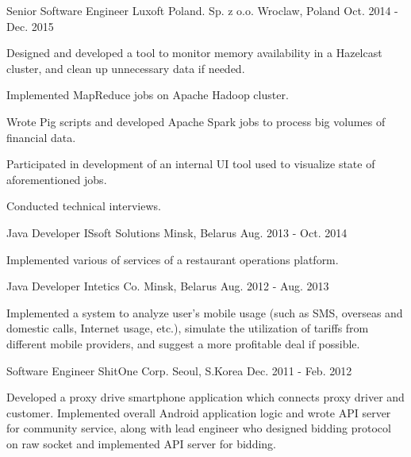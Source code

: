 \begin{cventries}
    \cventry
    {Senior Software Engineer} %
    {Luxoft Poland. Sp. z o.o.} %
    {Wroclaw, Poland} %
    {Oct. 2014 - Dec. 2015} %
    {
        \begin{cvitems} %
            \item {Designed and developed a tool to monitor memory availability in a Hazelcast cluster, and clean up unnecessary data if needed.}
            \item {Implemented MapReduce jobs on Apache Hadoop cluster.}
            \item {Wrote Pig scripts and developed Apache Spark jobs to process big volumes of financial data.}
            \item {Participated in development of an internal UI tool used to visualize state of aforementioned jobs.}
            \item {Conducted technical interviews.}
        \end{cvitems}
    }

    \cventry
    {Java Developer} %
    {ISsoft Solutions} %
    {Minsk, Belarus} %
    {Aug. 2013 - Oct. 2014} %
    {
        \begin{cvitems} %
            \item {Implemented various of services of a restaurant operations platform.}
        \end{cvitems}
    }

    \cventry
    {Java Developer} %
    {Intetics Co.} %
    {Minsk, Belarus} %
    {Aug. 2012 - Aug. 2013} %
    {
        \begin{cvitems} %
            \item {Implemented a system to analyze user’s mobile usage (such as SMS, overseas and domestic calls, Internet usage, etc.), simulate the utilization of tariffs from different mobile providers, and suggest a more profitable deal if possible.}
        \end{cvitems}
    }

    \cventry
    {Software Engineer} %
    {ShitOne Corp.} %
    {Seoul, S.Korea} %
    {Dec. 2011 - Feb. 2012} %
    {
        \begin{cvitems} %
            \item {Developed a proxy drive smartphone application which connects proxy driver and customer. Implemented overall Android application logic and wrote API server for community service, along with lead engineer who designed bidding protocol on raw socket and implemented API server for bidding.}
        \end{cvitems}
    }


\end{cventries}
